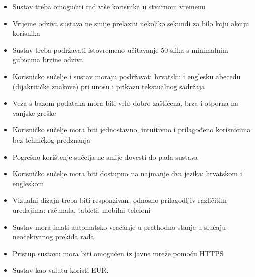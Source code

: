 			\begin{itemize}
	
				\item Sustav treba omogućiti rad više korisnika u stvarnom vremenu
				\item Vrijeme odziva sustava ne smije prelaziti nekoliko sekundi za bilo koju akciju korisnika
				\item Sustav treba podržavati istovremeno učitavanje 50 slika s minimalnim gubicima brzine odziva
				\item Korisnicko sučelje i sustav moraju podržavati hrvatsku i englesku abecedu (dijakritičke znakove) pri unosu i prikazu tekstualnog sadržaja
				\item Veza s bazom podataka mora biti vrlo dobro zaštićena, brza i otporna na vanjske greške
				\item Korisničko sučelje mora biti jednostavno, intuitivno i prilagođeno korisnicima bez tehničkog predznanja
				\item Pogrešno korištenje sučelja ne smije dovesti do pada sustava
				\item Korisničko sučelje mora biti dostupno na najmanje dva jezika: hrvatskom i engleskom
				\item Vizualni dizajn treba biti responzivan, odnosno prilagodljiv različitim uređajima: računala, tableti, mobilni telefoni
				\item Sustav mora imati automatsko vraćanje u prethodno stanje u slučaju neočekivanog prekida rada
				\item Pristup sustavu mora biti omogućen iz javne mreže pomoću HTTPS
				\item Sustav kao valutu koristi EUR.
			\end{itemize}
			 
			\eject{}
			 
	